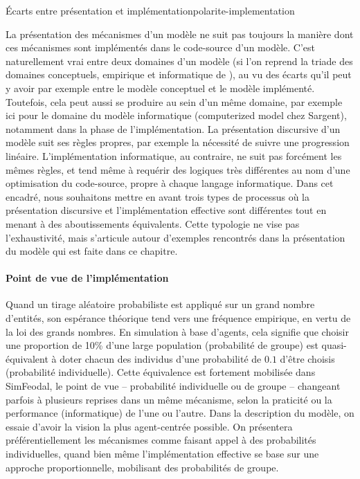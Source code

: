 \bigskip 
\begin{encadre}{Écarts entre présentation et implémentation}{polarite-implementation}
	
La présentation des mécanismes d'un modèle ne suit pas toujours la manière dont ces mécanismes sont implémentés dans le code-source d'un modèle.
C'est naturellement vrai entre deux \og domaines\fg{} d'un modèle (si l'on reprend la triade des domaines conceptuels, empirique et informatique de \textcite[\ppno~3, fig. 2]{sargent2009verification}), au vu des écarts qu'il peut y avoir par exemple entre le modèle conceptuel et le modèle implémenté.
Toutefois, cela peut aussi se produire au sein d'un même domaine, par exemple ici pour le domaine du modèle informatique (\og computerized model\fg{} chez Sargent), notamment dans la phase de l'implémentation.
La présentation discursive d'un modèle suit ses règles propres, par exemple la nécessité de suivre une progression linéaire.
L'implémentation informatique, au contraire, ne suit pas forcément les mêmes règles, et tend même à requérir des logiques très différentes au nom d'une \og optimisation\fg{} du code-source, propre à chaque langage informatique.
Dans cet encadré, nous souhaitons mettre en avant trois types de processus où la présentation discursive et l'implémentation effective sont différentes tout en menant à des aboutissements équivalents.
Cette typologie ne vise pas l'exhaustivité, mais s'articule autour d'exemples rencontrés dans la présentation du modèle qui est faite dans ce chapitre.

\paragraph{Point de vue de l'implémentation} Quand un tirage aléatoire probabiliste est appliqué sur un grand nombre d'entités, son espérance théorique tend vers une fréquence empirique, en vertu de la loi des grands nombres.
En simulation à base d'agents, cela signifie que choisir une proportion de 10\% d'une large population (\og probabilité de groupe\fg{}) est quasi-équivalent à doter chacun des individus d'une probabilité de $0.1$ d'être choisis (\og probabilité individuelle\fg{}).
Cette équivalence est fortement mobilisée dans SimFeodal, le \og point de vue\fg{} -- probabilité individuelle ou de groupe -- changeant parfois à plusieurs reprises dans un même mécanisme, selon la praticité ou la performance (informatique) de l'une ou l'autre.
Dans la description du modèle, on essaie d'avoir la vision la plus \og agent-centrée\fg{} possible.
On présentera préférentiellement les mécanismes comme faisant appel à des probabilités individuelles, quand bien même l'implémentation effective se base sur une approche proportionnelle, mobilisant des probabilités de groupe.


\end{encadre}
